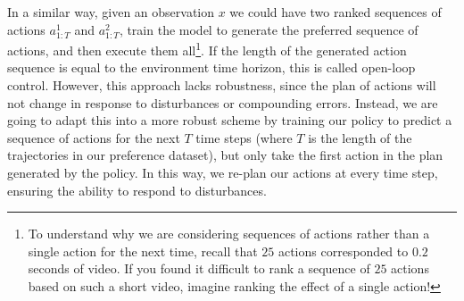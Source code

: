 In a similar way, given an observation $x$ we could have two ranked sequences of actions $a^1_{1:T}$ and $a^2_{1:T}$, train the model to generate the preferred sequence of actions, and then execute them all\footnote{To understand why we are considering sequences of actions rather than a single action for the next time, recall that $25$ actions corresponded to $0.2$ seconds of video. If you found it difficult to rank a sequence of $25$ actions based on such a short video, imagine ranking the effect of a single action!}. If the length of the generated action sequence is equal to the environment time horizon, this is called open-loop control. However, this approach lacks robustness, since the plan of actions will not change in response to disturbances or compounding errors. Instead, we are going to adapt this into a more robust scheme by training our policy to predict a sequence of actions for the next $T$ time steps (where $T$ is the length of the trajectories in our preference dataset), but only take the first action in the plan generated by the policy. In this way, we re-plan our actions at every time step, ensuring the ability to respond to disturbances.

\begin{enumerate}[(a)]

	

	

	

	

	

\end{enumerate}